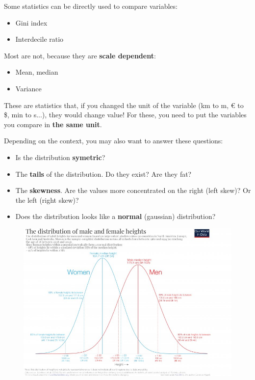 \documentclass[compress]{beamer}
\begin{document}
\begin{frame}
	Some statistics can be directly used to compare variables:
	\vspace{0.2cm}
	\begin{itemize}
		\item Gini index
		\item Interdecile ratio
	\end{itemize}
	\vspace{0.2cm}
	Most are not, because they are \textbf{scale dependent}:
	\vspace{0.2cm}
	\begin{itemize}
		\item Mean, median
		\item Variance
	\end{itemize}
	\vspace{0.2cm}
	These are statistics that, if you changed the unit of the variable (km to m, € to \$, min to s...), they would change value! For these, you need to put the variables you compare in \textbf{the same unit}.
\end{frame}

\begin{frame}
	Depending on the context, you may also want to answer these questions:
	\vspace{0.2cm}
	\begin{itemize}
		\item Is the distribution \textbf{symetric}?
		\vspace{0.2cm}
		\item The \textbf{tails} of the distribution. Do they exist? Are they fat?
		\vspace{0.2cm}
		\item The \textbf{skewness}. Are the values more concentrated on the right (left skew)? Or the left (right skew)?
		\item Does the distribution looks like a \textbf{normal} (gaussian) distribution?
	\end{itemize}
\end{frame}

\begin{frame}
	\begin{figure}
		\centering
		\includegraphics[scale=0.3]{Picture/men women height.jpeg}
	\end{figure}
\end{frame}
\end{document}
